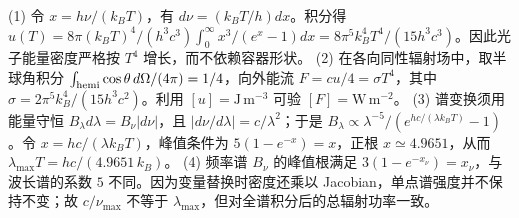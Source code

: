 (1) 令 \(x=h\nu/(k_BT)\)，有 \(d\nu=(k_BT/h)dx\)。积分得 \(u(T)=8\pi(k_BT)^4/(h^3c^3)\int_0^\infty x^3/(e^x-1)dx=8\pi^5 k_B^4T^4/(15h^3c^3)\)。因此光子能量密度严格按 \(T^4\) 增长，而不依赖容器形状。
(2) 在各向同性辐射场中，取半球角积分 \(\int_{\rm hemi}\cos\theta\,d\Omega/(4\pi)=1/4\)，向外能流 \(F=cu/4=\sigma T^4\)，其中 \(\sigma=2\pi^5k_B^4/(15h^3c^2)\)。利用 \([u]=\mathrm{J\,m^{-3}}\) 可验 \([F]=\mathrm{W\,m^{-2}}\)。
(3) 谱变换须用能量守恒 \(B_\lambda d\lambda=B_\nu|d\nu|\)，且 \(|d\nu/d\lambda|=c/\lambda^2\)；于是 \(B_\lambda\propto\lambda^{-5}/(e^{hc/(\lambda k_BT)}-1)\)。令 \(x=hc/(\lambda k_BT)\)，峰值条件为 \(5(1-e^{-x})=x\)，正根 \(x\simeq4.9651\)，从而 \(\lambda_{\max}T=hc/(4.9651\,k_B)\)。
(4) 频率谱 \(B_\nu\) 的峰值根满足 \(3(1-e^{-x_\nu})=x_\nu\)，与波长谱的系数 \(5\) 不同。因为变量替换时密度还乘以 Jacobian，单点谱强度并不保持不变；故 \(c/\nu_{\max}\) 不等于 \(\lambda_{\max}\)，但对全谱积分后的总辐射功率一致。
